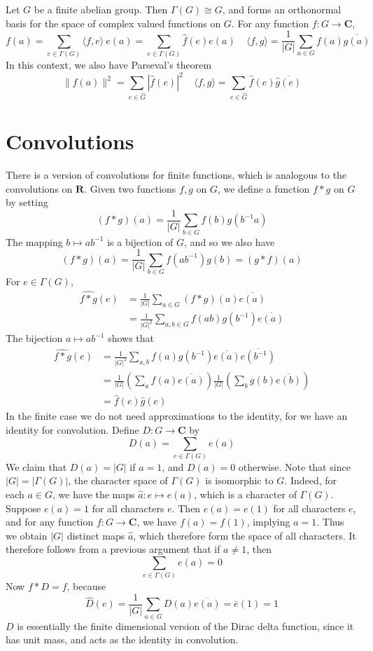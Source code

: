 \begin{theorem}
    Let $G$ be a finite abelian group. Then $\Gamma(G) \cong G$, and forms an orthonormal basis for the space of complex valued functions on $G$. For any function $f: G \to \mathbf{C}$,
    \[ f(a) = \sum_{e \in \Gamma(G)} \langle f, e \rangle\ e(a) = \sum_{e \in \Gamma(G)} \hat{f}(e) e(a)\ \ \ \ \ \langle f, g \rangle = \frac{1}{|G|} \sum_{a \in G} f(a) \overline{g(a)} \]
    In this context, we also have Parseval's theorem
    \[ \| f(a) \|^2 = \sum_{e \in \hat{G}} |\widehat{f}(e)|^2\ \ \ \ \ \langle f, g \rangle = \sum_{e \in \hat{G}} \widehat{f}(e) \overline{\widehat{g}(e)} \]
\end{theorem}

\section{Convolutions}

There is a version of convolutions for finite functions, which is analogous to the convolutions on $\mathbf{R}$. Given two functions $f,g$ on $G$, we define a function $f * g$ on $G$ by setting
%
\[ (f * g)(a) = \frac{1}{|G|} \sum_{b \in G} f(b) g(b^{-1} a) \]
%
The mapping $b \mapsto ab^{-1}$ is a bijection of $G$, and so we also have
%
\[ (f * g)(a) = \frac{1}{|G|} \sum_{b \in G} f(ab^{-1}) g(b) = (g * f)(a) \]
%
For $e \in \Gamma(G)$,
%
\begin{align*}
    \widehat{f * g}(e) &= \frac{1}{|G|} \sum_{a \in G} (f*g)(a) \overline{e(a)}\\
    &= \frac{1}{|G|^2} \sum_{a,b \in G} f(ab) g(b^{-1}) \overline{e(a)}
\end{align*}
%
The bijection $a \mapsto ab^{-1}$ shows that
%
\begin{align*}
    \widehat{f*g}(e) &= \frac{1}{|G|^2} \sum_{a,b} f(a) g(b^{-1}) \overline{e(a)} \overline{e(b^{-1})}\\
    &= \frac{1}{|G|} \left( \sum_a f(a) \overline{e(a)} \right) \frac{1}{|G|} \left( \sum_b g(b) \overline{e(b)} \right)\\
    &= \widehat{f}(e) \widehat{g}(e)
\end{align*}
%
In the finite case we do not need approximations to the identity, for we have an identity for convolution. Define $D: G \to \mathbf{C}$ by
%
\[ D(a) = \sum_{e \in \Gamma(G)} e(a) \]
%
We claim that $D(a) = |G|$ if $a = 1$, and $D(a) = 0$ otherwise. Note that since $|G| = |\Gamma(G)|$, the character space of $\Gamma(G)$ is isomorphic to $G$. Indeed, for each $a \in G$, we have the maps $\widehat{a}: e \mapsto e(a)$, which is a character of $\Gamma(G)$. Suppose $e(a) = 1$ for all characters $e$. Then $e(a) = e(1)$ for all characters $e$, and for any function $f: G \to \mathbf{C}$, we have $f(a) = f(1)$, implying $a = 1$. Thus we obtain $|G|$ distinct maps $\widehat{a}$, which therefore form the space of all characters. It therefore follows from a previous argument that if $a \neq 1$, then
%
\[ \sum_{e \in \Gamma(G)} e(a) = 0 \]
%
Now $f * D = f$, because
%
\[ \widehat{D}(e) = \frac{1}{|G|} \sum_{a \in G} D(a) \overline{e(a)} = \overline{e}(1) = 1 \]
%
$D$ is essentially the finite dimensional version of the Dirac delta function, since it has unit mass, and acts as the identity in convolution.

